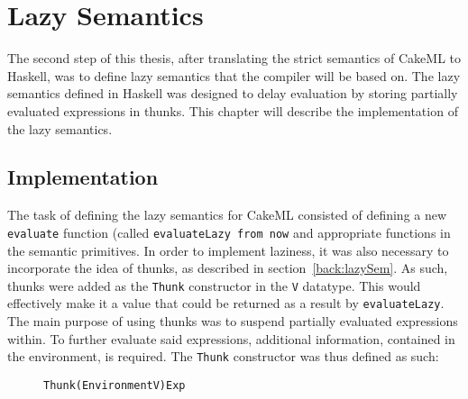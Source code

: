 \chapter{Lazy Semantics}
\label{lazySem}
The second step of this thesis, after translating the strict semantics of CakeML
to Haskell, was to define lazy semantics that the compiler will be based on.
The lazy semantics defined in Haskell was designed to delay evaluation by
storing partially evaluated expressions in thunks. This chapter will describe
the implementation of the lazy semantics.

\section{Implementation}
\label{lazySem:impl}

The task of defining the lazy semantics for CakeML consisted of defining a new
\texttt{evaluate} function (called \texttt{evaluateLazy from now} and
appropriate functions in the semantic primitives.
In order to implement laziness, it was also necessary to incorporate the idea of
thunks, as described in section~\ref{back:lazySem}. As such, thunks were added
as the \texttt{Thunk} constructor in the \texttt{V} datatype. This would
effectively make it a value that could be returned as a result by
\texttt{evaluateLazy}. The main purpose of using thunks was to suspend partially
evaluated expressions within. To further evaluate said expressions, additional
information, contained in the environment, is required.
The \texttt{Thunk} constructor was thus defined as such:

\begin{figure}[H]
\begin{alltt}
  Thunk (Environment V) Exp
\end{alltt}
\end{figure}

